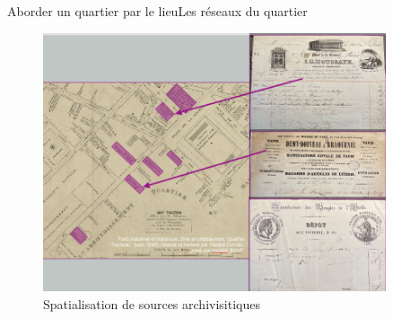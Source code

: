 \documentclass[8pt]{beamer}
\begin{document}
\begin{frame}{Aborder un quartier par le lieu}{Les réseaux du quartier}
	\begin{figure}
		\centering
		\includegraphics[width=0.9\textwidth]{includes/spatial0.png}
		\caption{Spatialisation de sources archivisitiques}
	\end{figure}
\end{frame}
\end{document}
